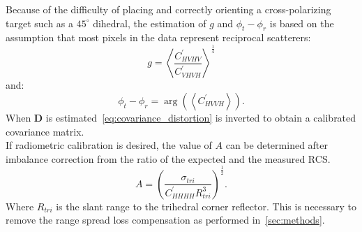 Because of the difficulty of placing and correctly orienting a cross-polarizing target such as a $45^\circ$ dihedral, the estimation of $g$ and $\phi_t - \phi_r$ is based on the assumption that most pixels in the data represent reciprocal scatterers:
\begin{equation}
	g = \left<\frac{C_{HVHV}^{\prime}}{C_{VHVH}^{\prime}}\right>^\frac{1}{4}
\end{equation}
and:
\begin{equation}
	\phi_t - \phi_r =\operatorname{arg}\left( \left<C_{HVVH}^{\prime}\right>\right).
\end{equation}
When $\mathbf{D}$ is estimated~\autoref{eq:covariance_distortion} is inverted to obtain a calibrated covariance matrix.\\
If radiometric calibration is desired, the value of $A$ can be determined after imbalance correction from the ratio of the expected and the measured RCS.
\begin{equation}
	A =	\left(\frac{\sigma_{tri}}{C^{\prime}_{HHHH} R_{tri}^{3}}\right)^\frac{1}{2}.
\end{equation}
Where $R_{tri}$ is the slant range to the trihedral corner reflector. This is necessary to remove the range spread loss compensation as performed in~\autoref{sec:methods}.
